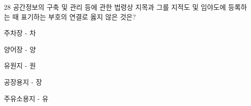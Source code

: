 \begin{question}{28}
공간정보의 구축 및 관리 등에 관한 법령상 지목과 그를 지적도 및 임야도에 등록하는 때 표기하는 부호의 연결로 옳지 않은 것은?
\begin{choices}
  \item 주차장 - 차
  \item 양어장 - 양
  \item 유원지 - 원
  \item 공장용지 - 장
  \item 주유소용지 - 유
\end{choices}
\end{question}
